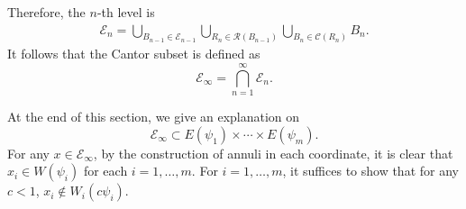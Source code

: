 \documentclass[11pt]{amsart}
\numberwithin{equation}{section}
\newcommand{\0}{\mathbf{0}}
\theoremstyle{remark}
\begin{document}
{\begin{enumerate}
\end{enumerate}



Therefore, the $n$-th level is
\begin{align*}
\mathcal{E}_n=\bigcup_{B_{n-1}\in\mathcal{E}_{n-1}}\bigcup_{R_{n}\in\mathcal{R}(B_{n-1})}\bigcup_{B_{n}\in\mathcal{C}(R_{n})}B_n.
\end{align*}
It follows that the Cantor subset is defined as
$$\mathcal{E}_{\infty}=\bigcap_{n=1}^{\infty}\mathcal{E}_n.$$

At the end of this section, we give an explanation on $$\mathcal{E}_{\infty}\subset E(\psi_1)\times\cdots\times E(\psi_m).$$
For any $x\in\mathcal{E}_{\infty}$, by the construction of annuli in each coordinate, it is clear that
$x_i\in W(\psi_i)$ for each $i=1,\ldots, m$.
For $i=1,\ldots,m$, it suffices to show that for any $c<1$, $x_i\notin W_i(c\psi_i)$.

}
\end{document}
